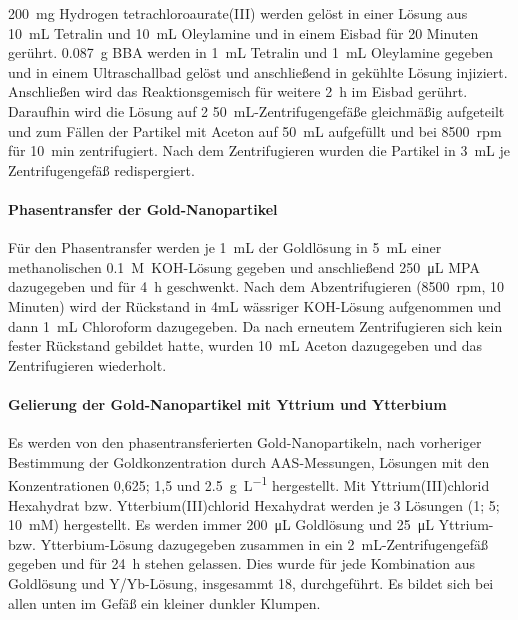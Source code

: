 			\SI{200}{\milli\gram} Hydrogen tetrachloroaurate(III) werden gelöst in einer Lösung aus \SI{10}{\milli\liter} Tetralin und \SI{10}{\milli\liter} Oleylamine und in einem Eisbad für 20 Minuten gerührt.
			\SI{0,087}{\gram} BBA werden in \SI{1}{\milli\liter} Tetralin und \SI{1}{\milli\liter} Oleylamine gegeben und in einem Ultraschallbad gelöst und anschließend in gekühlte Lösung injiziert.
			Anschließen wird das Reaktionsgemisch für weitere \SI{2}{\hour} im Eisbad gerührt.
			Daraufhin wird die Lösung auf 2 \SI{50}{\milli\liter}-Zentrifugengefäße gleichmäßig aufgeteilt und zum Fällen der Partikel mit Aceton auf \SI{50}{\milli\liter} aufgefüllt und bei 8500~rpm für \SI{10}{\minute} zentrifugiert.
			Nach dem Zentrifugieren wurden die Partikel in \SI{3}{\milli\liter} je Zentrifugengefäß redispergiert.
				
			\paragraph{Phasentransfer der Gold-Nanopartikel}
		
			Für den Phasentransfer werden je \SI{1}{\milli\liter} der Goldlösung in \SI{5}{\milli\liter} einer methanolischen \SI{0,1}{M}~KOH-Lösung gegeben und anschließend \SI{250}{\micro\liter} MPA dazugegeben und für \SI{4}{\hour} geschwenkt.
			Nach dem Abzentrifugieren (8500~rpm, 10 Minuten) wird der Rückstand in 4mL wässriger KOH-Lösung aufgenommen und dann \SI{1}{\milli\liter} Chloroform dazugegeben. 
			Da nach erneutem Zentrifugieren sich kein fester Rückstand gebildet hatte, wurden \SI{10}{\milli\liter} Aceton dazugegeben und das Zentrifugieren wiederholt.
				
			\paragraph{Gelierung der Gold-Nanopartikel mit Yttrium und Ytterbium}
				
			Es werden von den phasentransferierten Gold-Nanopartikeln, nach vorheriger Bestimmung der Goldkonzentration durch AAS-Messungen, Lösungen mit den Konzentrationen 0,625; 1,5 und \SI{2,5}{\gram\per\liter} hergestellt.
			Mit Yttrium(III)chlorid Hexahydrat bzw. Ytterbium(III)chlorid Hexahydrat werden je 3 Lösungen (1; 5; \SI{10}{mM}) hergestellt.
			Es werden immer \SI{200}{\micro\liter} Goldlösung und \SI{25}{\micro\liter} Yttrium- bzw. Ytterbium-Lösung dazugegeben zusammen in ein \SI{2}{\milli\liter}-Zentrifugengefäß gegeben und für \SI{24}{\hour} stehen gelassen.
			Dies wurde für jede Kombination aus Goldlösung und Y/Yb-Lösung, insgesammt 18, durchgeführt.
			Es bildet sich bei allen unten im Gefäß ein kleiner dunkler Klumpen.
			  
